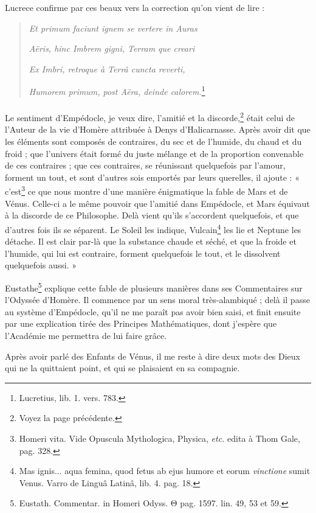 \documentclass[a4paper, 11pt, oneside, polutonikogreek, french]{article}
\begin{document}
Lucrece confirme par ces beaux vers la correction qu'on vient de lire :
\begin{quotation}
\emph{Et primum faciunt ignem se vertere in Auras}

\emph{Aëris, hinc Imbrem gigni, Terram que creari}

\emph{Ex Imbri, retroque à Terrâ cuncta reverti,}

\emph{Humorem primum, post Aëra, deinde calorem.}\footnote{Lucretius, lib. 1. vers. 783.}
\end{quotation}
\paragraph{}
Le sentiment d'Empédocle, je veux dire, l'amitié et la discorde,\footnote{Voyez la page précédente.} était celui de l'Auteur de la vie d'Homère attribuée à Denys d'Halicarnasse. Après avoir dit que les éléments sont composés de contraires, du sec et de l'humide, du chaud et du froid ; que l'univers était formé du juste mélange et de la proportion convenable de ces contraires ; que ces contraires, se réunissant quelquefois par l'amour, forment un tout, et sont d'autres sois emportés par leurs querelles, il ajoute : « c'est\footnote{Homeri vita. Vide Opuscula Mythologica, Physica, \emph{etc.} edita à Thom Gale, pag. 328.} ce que nous montre d'une manière énigmatique la fable de Mars et de Vénus. Celle-ci a le même pouvoir que l'amitié dans Empédocle, et Mars équivaut à la discorde de ce Philosophe. Delà vient qu'ils s'accordent quelquefois, et que d'autres fois ils se séparent. Le Soleil les indique, Vulcain\footnote{Mas ignis... aqua femina, quod fetus ab ejus humore et eorum \emph{vinctione} sumit Venus. Varro de Linguâ Latinâ, lib. 4. pag. 18.} les lie et Neptune les détache. Il est clair par-là que la substance chaude et séché, et que la froide et l'humide, qui lui est contraire, forment quelquefois le tout, et le dissolvent quelquefois aussi. »

Eustathe\footnote{Eustath. Commentar. in Homeri Odyss. Θ pag. 1597. lin. 49, 53 et 59.} explique cette fable de plusieurs manières dans ses Commentaires sur l'Odyssée d'Homère. Il commence par un sens moral très-alambiqué ; delà il passe au système d'Empédocle, qu'il ne me paraît pas avoir bien saisi, et finit ensuite par une explication tirée des Principes Mathématiques, dont j'espère que l'Académie me permettra de lui faire grâce.

Après avoir parlé des Enfants de Vénus, il me reste à dire deux mots des Dieux qui ne la quittaient point, et qui se plaisaient en sa compagnie.
\end{document}
